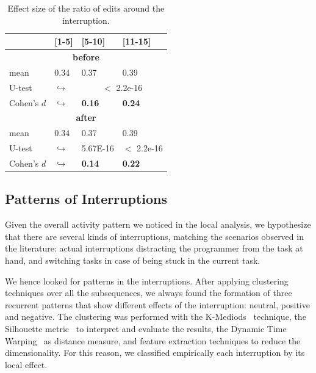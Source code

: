 \documentclass[times]{smrauth}
\begin{document}
\begin{table}[ht!]
\renewcommand{\arraystretch}{1.3}
\caption{Effect size of the ratio of edits around the interruption.}
\label{tbl:ratio_all}
\centering
\begin{tabular}{l | p{0.7cm} | p{1.9cm} | p{1.9cm} } 
   & [1-5] & [5-10] & [11-15] \\  
  \hline
  \multicolumn{4}{c}{\textbf{before}} \\
  \hline
  mean & 0.34 &	0.37 &	0.39 \\ 
   \cline{3-4} 
  U-test & $\hookrightarrow$ & \multicolumn{2}{c}{$<$ 2.2e-16}  \\

  \cline{3-4} 
  Cohen's $d$ & $\hookrightarrow$	& \textbf{0.16} & \textbf{0.24}   \\
  \hline
  
  
  \multicolumn{4}{c}{\textbf{after}} \\
  \hline 
  mean & 0.34 &	0.37 &	0.39 \\ 
   \cline{3-4} 
  U-test & $\hookrightarrow$ & 5.67E-16 & $<$ 2.2e-16 \\  
  \cline{3-4} 
  Cohen's $d$ & $\hookrightarrow$	& \textbf{0.14} & \textbf{0.22}  \\  
\end{tabular}
\end{table}

\subsection{Patterns of Interruptions}
Given the overall activity pattern we noticed in the local analysis, we hypothesize that there are several kinds of interruptions, matching the scenarios observed in the literature: actual interruptions distracting the programmer from the task at hand, and switching tasks in case of being stuck in the current task.

We hence looked for patterns in the interruptions.  After applying clustering techniques over all the subsequences, we always found the formation of three recurrent patterns that show different effects of the interruption: neutral, positive and negative. The clustering was performed with the  K-Mediods~\cite{AMP97} technique, the Silhouette metric~\cite{RP87} to interpret and evaluate the results, the Dynamic Time Warping~\cite{KE05} as distance measure, and feature extraction techniques to reduce the dimensionality.  For this reason, we classified empirically each interruption by its local effect. 
\end{document}

